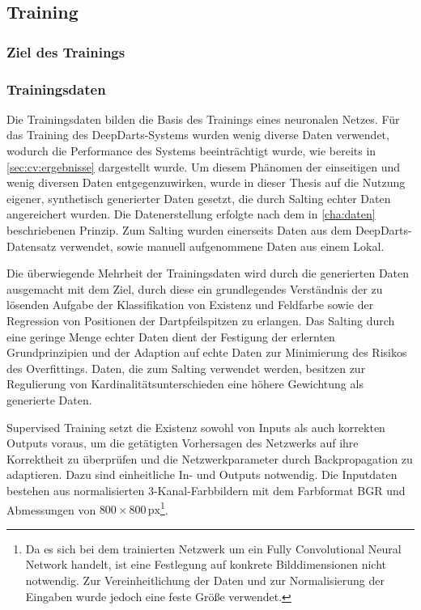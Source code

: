 \subsection{Training}
\label{sec:nn_training}

\subsubsection{Ziel des Trainings}

\todo{}

\subsubsection{Trainingsdaten}
\label{sec:trainingsdaten}

Die Trainingsdaten bilden die Basis des Trainings eines neuronalen Netzes. Für das Training des DeepDarts-Systems wurden wenig diverse Daten verwendet, wodurch die Performance des Systems beeinträchtigt wurde, wie bereits in \autoref{sec:cv:ergebnisse} dargestellt wurde. Um diesem Phänomen der einseitigen und wenig diversen Daten entgegenzuwirken, wurde in dieser Thesis auf die Nutzung eigener, synthetisch generierter Daten gesetzt, die durch Salting echter Daten angereichert wurden. Die Datenerstellung erfolgte nach dem in \autoref{cha:daten} beschriebenen Prinzip. Zum Salting wurden einerseits Daten aus dem DeepDarts-Datensatz verwendet, sowie manuell aufgenommene Daten aus einem Lokal.

Die überwiegende Mehrheit der Trainingsdaten wird durch die generierten Daten ausgemacht mit dem Ziel, durch diese ein grundlegendes Verständnis der zu lösenden Aufgabe der Klassifikation von Existenz und Feldfarbe sowie der Regression von Positionen der Dartpfeilspitzen zu erlangen. Das Salting durch eine geringe Menge echter Daten dient der Festigung der erlernten Grundprinzipien und der Adaption auf echte Daten zur Minimierung des Risikos des Overfittings. Daten, die zum Salting verwendet werden, besitzen zur Regulierung von Kardinalitätsunterschieden eine höhere Gewichtung als generierte Daten.

Supervised Training setzt die Existenz sowohl von Inputs als auch korrekten Outputs voraus, um die getätigten Vorhersagen des Netzwerks auf ihre Korrektheit zu überprüfen und die Netzwerkparameter durch Backpropagation zu adaptieren. Dazu sind einheitliche In- und Outputs notwendig. Die Inputdaten bestehen aus normalisierten 3-Kanal-Farbbildern mit dem Farbformat BGR und Abmessungen von $800 \times 800\,\text{px}$\footnote{Da es sich bei dem trainierten Netzwerk um ein Fully Convolutional Neural Network handelt, ist eine Festlegung auf konkrete Bilddimensionen nicht notwendig. Zur Vereinheitlichung der Daten und zur Normalisierung der Eingaben wurde jedoch eine feste Größe verwendet.}.

